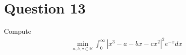 \section{Question 13}
\horz
Compute 
\begin{align*}
\min_{a,b,c\in \mathbb R} \int_{0}^{\infty}|x^3-a-bx-cx^2|^2e^{-x} dx
\end{align*}
\horz
